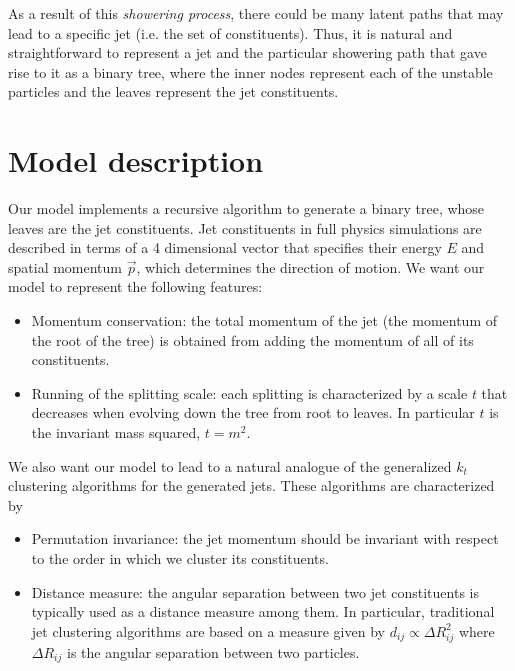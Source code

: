 \documentclass[12pt]{article}
\begin{document}
As a result of this {\it showering process}, there could be many latent paths that may lead to a specific jet (i.e. the set of constituents). Thus, it is natural and straightforward to represent a jet and the particular showering path that gave rise to it as a binary tree, where the inner nodes represent each of the unstable particles and the leaves represent the jet constituents.  


\vspace{0.6cm}
\section{Model description}

Our model implements a recursive algorithm to generate a binary tree, whose leaves are the jet constituents. Jet constituents in full physics simulations are described in terms of a 4 dimensional vector that specifies their energy $E$ and spatial momentum $\vec{p}$, which determines the direction of motion. 
We want our model to represent the following features:
\begin{itemize}
\item Momentum conservation: the total momentum of the jet (the momentum of the root of the tree) is obtained from adding the momentum of all of its constituents.

\item Running of the splitting scale: each splitting is characterized by a scale $t$ that decreases when evolving down the tree from root to leaves. In particular $t$ is the invariant mass squared, $t = m^2$.





\end{itemize}

We also want our model to lead to a natural analogue of the generalized $k_t$ clustering algorithms for the generated jets. These algorithms are characterized by

\begin{itemize}
\item Permutation invariance: the jet momentum should be invariant with respect to the order in which we cluster its constituents.

\item Distance measure: the angular separation between two jet constituents is typically used as a distance measure among them. In particular, traditional jet clustering algorithms are based on a measure given by 
$d_{ij} \propto  \Delta R_{ij}^2$
where $\Delta R_{ij}$ is the angular separation between two particles.

\end{itemize} 
\end{document}
